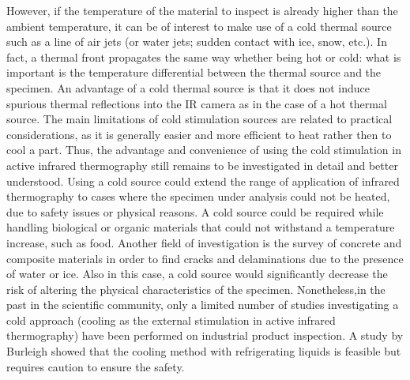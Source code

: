 However, if the temperature of the material to inspect is already higher than the ambient temperature, it can be of interest to make use of a cold thermal source such as a line of air jets (or water jets; sudden contact with ice, snow, etc.). In fact, a thermal front propagates the same way whether being hot or cold: what is important is the temperature differential between the thermal source and the specimen. An advantage of a cold thermal source is that it does not induce spurious thermal reflections into the IR camera as in the case of a hot thermal source. The main limitations of cold stimulation sources are related to practical considerations, as it is generally easier and more efficient to heat rather then to cool a part.
Thus, the advantage and convenience of using the cold stimulation in active infrared thermography  still remains to be investigated in detail and better understood. Using a cold source could extend the range of application of infrared thermography to cases where the specimen under analysis could not be heated, due to safety issues or physical reasons\citet{Livingston2018High}. A cold source could be required while handling biological or organic materials   that could not withstand a temperature increase, such as food. Another field of investigation is the survey of concrete and composite materials in order to find cracks and delaminations due to the presence of water or ice. Also in this case, a cold source would significantly decrease the risk of altering the physical characteristics of the specimen. 
Nonetheless,in the past in the scientific community, only a limited number of studies investigating a cold approach (cooling as the external stimulation in active infrared thermography) have been performed on industrial product inspection\citet{endohdynamical2012,2012-LewisHom}. A study by Burleigh\citet{1989Burleigh} showed that the cooling method with refrigerating liquids is feasible but requires caution to ensure the safety.
